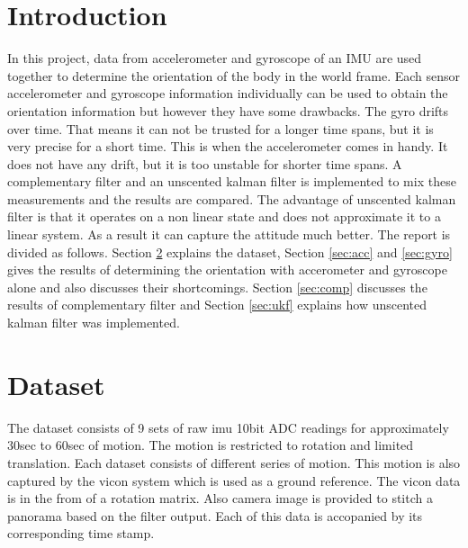 \documentclass[fleqn,10pt]{SelfArx} %
\begin{document}
\flushbottom %

\maketitle %

\tableofcontents %

\thispagestyle{empty} %

\section{Introduction}
In this project, data from accelerometer and gyroscope of an IMU are used together to determine the orientation of the body in the world frame. Each sensor accelerometer and gyroscope information individually can be used to obtain the orientation information but however they have some drawbacks. The gyro drifts over time. That means it can not be trusted for a longer time spans, but it is very precise for a short time. This is when the accelerometer comes in handy. It does not have any drift, but it is too unstable for shorter time spans. A complementary filter and an unscented kalman filter is implemented to mix these measurements and the results are compared. The advantage of unscented kalman filter is that it operates on a non linear state and does not approximate it to a linear system. As a result it can capture the attitude much better. The report is divided as follows. Section \ref{sec:dataset} explains the dataset, Section \ref{sec:acc} and \ref{sec:gyro} gives the results of determining the orientation with accerometer and gyroscope alone and also discusses their shortcomings. Section \ref{sec:comp} discusses the results of complementary filter and Section \ref{sec:ukf} explains how unscented kalman filter was implemented. 

\section{Dataset}
\label{sec:dataset}
The dataset consists of 9 sets of raw imu 10bit ADC readings for approximately 30sec to 60sec of motion. The motion is restricted to rotation and limited translation. Each dataset consists of different series of motion. This motion is also captured by the vicon system which is used as a ground reference. The vicon data is in the from of a rotation matrix. Also camera image is provided to stitch a panorama based on the filter output. Each of this data is accopanied by its corresponding time stamp.
\end{document}
